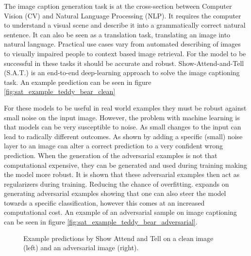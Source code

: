 
The image caption generation task is at the cross-section between Computer Vision (CV) and Natural Language Processing (NLP). It requires the computer to understand a visual scene and describe it into a grammatically correct natural sentence. It can also be seen as a translation task, translating an image into natural language. Practical use cases vary from automated describing of images to visually impaired people \cite{mazzoni_2019} to context based image retrieval. For the model to be successful in these tasks it should be accurate and robust. Show-Attend-and-Tell (S.A.T.) \cite{xu2016show} is an end-to-end deep-learning approach to solve the image captioning task. An example prediction can be seen in figure \ref{fig:sat_example_teddy_bear_clean}

For these models to be useful in real world examples they must be robust against small noise on the input image. However, the problem with machine learning is that models can be very susceptible to noise. As small changes to the input can lead to radically different outcomes. As shown by \citeauthor{goodfellow2015explaining} adding a specific (small) noise layer to an image can alter a correct prediction to a very confident wrong prediction. When the generation of the adversarial examples is not that computational expensive, they can be generated and used during training making the model more robust. It is shown that these adversarial examples then act as regularizers during training. Reducing the chance of overfitting. \citeauthor{Kurakin} expands on generating adversarial examples showing that one can also steer the model towards a specific classification, however this comes at an increased computational cost. An example of an adversarial sample on image captioning can be seen in figure \ref{fig:sat_example_teddy_bear_adversarial}.

\begin{figure*}[h]
    \centering
    \vspace{\floatsep}
    \caption{Example predictions by Show Attend and Tell on a clean image (left) and an adversarial image (right).}

\end{figure*}

